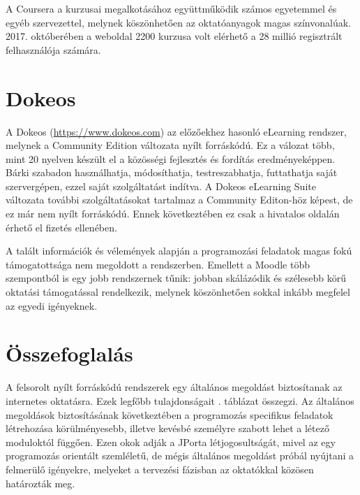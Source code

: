 A Coursera a kurzusai megalkotásához együttműködik számos egyetemmel és egyéb szervezettel, melynek köszönhetően az oktatóanyagok magas színvonalúak. 2017. októberében a weboldal 2200 kurzusa volt elérhető a 28 millió regisztrált felhasználója számára.

\section{Dokeos}

A Dokeos (\url{https://www.dokeos.com}) az előzőekhez hasonló eLearning rendszer, melynek a Community Edition változata nyílt forráskódú. Ez a válozat több, mint 20 nyelven készült el a közösségi fejlesztés és fordítás eredményeképpen. Bárki szabadon használhatja, módosíthatja, testreszabhatja, futtathatja saját szervergépen, ezzel saját szolgáltatást indítva. A Dokeos eLearning Suite változata további szolgáltatásokat tartalmaz a Community Editon-höz képest, de ez már nem nyílt forráskódú. Ennek következtében ez csak a hivatalos oldalán érhető el fizetés ellenében.

A talált információk és vélemények alapján a programozási feladatok magas fokú támogatottsága nem megoldott a rendszerben. Emellett a Moodle több szempontból is egy jobb rendszernek tűnik:  jobban skálázódik és szélesebb körű oktatási támogatással rendelkezik, melynek köszönhetően sokkal inkább megfelel az egyedi igényeknek. \cite{DokeosVsMoodle}

\section{Összefoglalás}

A felsorolt nyílt forráskódú rendszerek egy általános megoldást biztosítanak az internetes oktatásra. Ezek legfőbb tulajdonságait . táblázat összegzi. Az általános megoldások biztosításának következtében a programozás specifikus feladatok létrehozása körülményesebb, illetve kevésbé személyre szabott lehet a létező moduloktól függően. Ezen okok adják a JPorta létjogosultságát, mivel az egy programozás orientált szemléletű, de mégis általános megoldást próbál nyújtani a felmerülő igényekre, melyeket a tervezési fázisban az oktatókkal közösen határozták meg.

